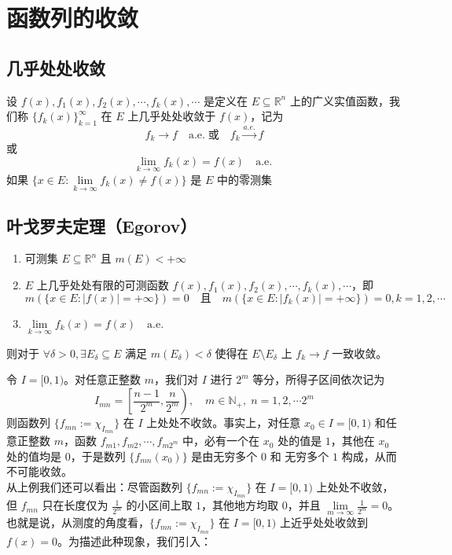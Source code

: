 \documentclass{ctexbook}
\newcommand{\no}{\noindent}
\newcommand{\EXP}{\no {\bf 例}\quad}
\newcommand{\R}{\mathbb{R}}
\newcommand{\nae}{\mathrm{\quad a.e.\; }}
\newcommand{\ITEMS}{\begin{enumerate}[leftmargin=4em]}
\newcommand{\ITEME}{\end{enumerate}}
\begin{document}
\section{函数列的收敛}

\subsection{几乎处处收敛}

设 $f(x) , f_1(x) , f_2(x) ,\cdots, f_k(x), \cdots$ 是定义在 $E\subseteq \R^n$ 上的广义实值函数，我们称 $\{f_k(x)\}_{k=1}^\infty$ 在 $E$ 上几乎处处收敛于 $f(x)$，记为
\[
f_k \to f \nae \mbox {或}\quad f_k \xrightarrow{a.e.} f
\]
或
\[
\lim\limits_{k\to \infty} f_k(x) = f(x) \nae
\]
如果 $\{x\in E :\lim\limits_{k\to \infty}f_k(x) \neq f(x)\}$ 是 $E$ 中的零测集
\subsection{叶戈罗夫定理（Egorov）}

\ITEMS
\item 可测集 $E \subseteq \R^n$ 且 $m(E) < +\infty$
\item $E$ 上几乎处处有限的可测函数 $f(x),f_1(x),f_2(x),\cdots,f_k(x),\cdots$，即
\[
m(\{x\in E: \lvert f(x)\rvert = +\infty \}) = 0 \quad \mbox {且} \quad m(\{x\in E: \lvert f_k(x)\rvert = +\infty \}) = 0, k=1, 2, \cdots 
\]
\item $\lim\limits_{k\to \infty} f_k(x) = f(x) \nae$	
\ITEME
则对于 $\forall\delta > 0,\exists E_\delta \subseteq E$ 满足 $m(E_\delta) < \delta$ 使得在 $E\setminus E_\delta$ 上 $f_k \to f$ 一致收敛。\\

\EXP 

令 $I = [0,1)$。对任意正整数 $m$，我们对 $I$ 进行 $2^m$ 等分，所得子区间依次记为
\[
I_{mn} = \left[\frac{n-1}{2^{m}},\frac{n}{2^{m}}\right), \quad  m\in \mathbb{N}_+ ,\; n=1, 2, \cdots 2^{m}
\]
则函数列 $\{f_{mn}:= \chi_{I_{mn}}\}$ 在 $I$ 上处处不收敛。事实上，对任意 $x_0 \in I = [0,1)$ 和任意正整数 $m$，函数 $f_{m1}, f_{m2}, \cdots, f_{m2^m}$ 中，必有一个在 $x_0$ 处的值是 $1$，其他在 $x_0$ 处的值均是 $0$，于是数列 $\{f_{mn}(x_0)\}$ 是由无穷多个 $0$ 和 无穷多个 $1$ 构成，从而不可能收敛。\\

从上例我们还可以看出：尽管函数列 $\{f_{mn}:= \chi_{I_{mn}}\}$ 在 $I= [0,1)$ 上处处不收敛，但 $f_{mn}$ 只在长度仅为 $\frac{1}{2^m}$ 的小区间上取 $1$，其他地方均取 $0$，并且 $\lim\limits_{m\to \infty}\frac{1}{2^m}=0$。 也就是说，从测度的角度看，$\{f_{mn}:= \chi_{I_{mn}}\}$ 在 $I= [0,1)$ 上近乎处处收敛到 $f(x)=0$。为描述此种现象，我们引入：
\end{document}
